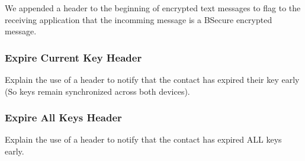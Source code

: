 We appended a header to the beginning of encrypted text messages to flag to the receiving application that
the incomming message is a BSecure encrypted message.

\subsubsection{Expire Current Key Header}
Explain the use of a header to notify that the contact has expired their key early (So keys remain synchronized across both devices).

\subsubsection{Expire All Keys Header}
Explain the use of a header to notify that the contact has expired ALL keys early.


